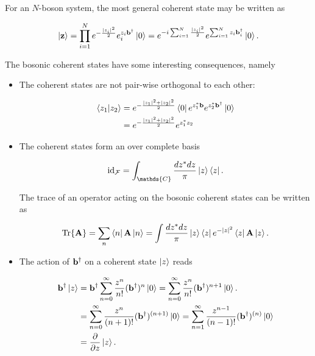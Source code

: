 \documentclass{homework}
\begin{document}
For an $N$-boson system, the most general coherent state may be written as 

\begin{equation}
    \ket{{\bf z}} = \prod_{i=1}^N e^{-\frac{|z_i|^2}{2}} e^{z_i {\bf b}^\dagger}_i \ket{0} = e^{-i \sum_{i=1}^N \frac{|z_i|^2}{2}} e^{\sum_{i=1}^N z_i {\bf b}_i^\dagger} \ket{0}.
\end{equation}

The bosonic coherent states have some interesting consequences, namely 

\begin{itemize}
    \item The coherent states are not pair-wise orthogonal to each other:
    
    \begin{equation}
        \begin{split}
            \bra{z_1}\ket{z_2} &= e^{-\frac{|z_1|^2+|z_2|^2}{2}} \bra{0} e^{z_1^* {\bf b}} e^{z_2^* {\bf b}^\dagger} \ket{0} \\
            &= e^{-\frac{|z_1|^2+|z_2|^2}{2}} e^{z_1^* z_2}
        \end{split}
    \end{equation}
    
    \item The coherent states form an over complete basis
    
    $$
    \textnormal{id}_{\mathcal{F}} = \int_{\mathds{C}} \frac{dz^* dz}{\pi} \ket{z} \bra{z}.
    $$
    
    The trace of an operator acting on the bosonic coherent states can be written as 
    
    $$
        \Tr {{\bf A}} = \sum_n \bra{n} {{\bf A}} \ket{n} = \int \frac{dz^* dz}{\pi} \ket{z} \bra{z} e^{-|z|^2} \bra{z}{{\bf A}}\ket{z}.
    $$
    
    \item The action of ${\bf b}^\dagger$ on a coherent state $\ket{z}$ reads
    
    \begin{equation}
        \begin{split}
            {\bf b}^\dagger \ket{z} &= {\bf b}^\dagger \sum_{n=0}^{\infty} \frac{z^n}{n!} ({\bf b}^\dagger )^{n} \ket{0} = \sum_{n=0}^{\infty} \frac{z^n}{n!} ({\bf b}^\dagger )^{n+1} \ket{0}. \\
            &= \sum_{n=0}^{\infty} \frac{z^n}{(n+1)!} ({\bf b}^\dagger )^{(n+1)} \ket{0} = \sum_{n=1}^{\infty} \frac{z^{n-1}}{(n-1)!} ({\bf b}^\dagger)^{(n)} \ket{0}\\
            &= \frac{\partial}{\partial z} \ket{z}.
        \end{split}
    \end{equation}
    

\end{itemize}
\end{document}
